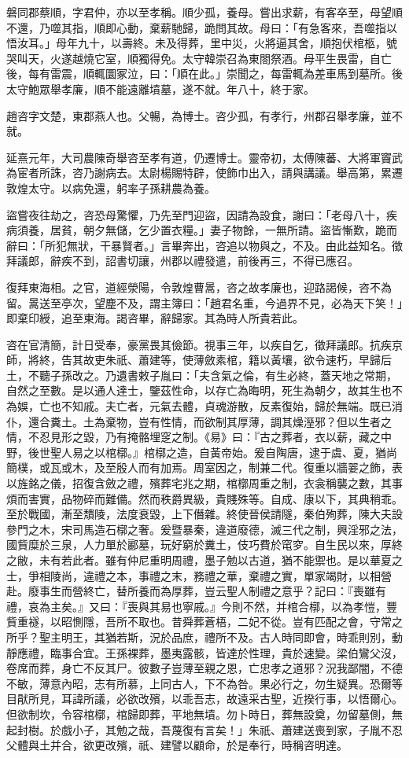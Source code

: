 \begin{pinyinscope}
磐同郡蔡順，字君仲，亦以至孝稱。順少孤，養母。嘗出求薪，有客卒至，母望順不還，乃噬其指，順即心動，棄薪馳歸，跪問其故。母曰：「有急客來，吾噬指以悟汝耳。」母年九十，以壽終。未及得葬，里中災，火將逼其舍，順抱伏棺柩，號哭叫天，火遂越燒它室，順獨得免。太守韓崇召為東閤祭酒。母平生畏雷，自亡後，每有雷震，順輒圜冢泣，曰：「順在此。」崇聞之，每雷輒為差車馬到墓所。後太守鮑眾舉孝廉，順不能遠離墳墓，遂不就。年八十，終于家。

趙咨字文楚，東郡燕人也。父暢，為博士。咨少孤，有孝行，州郡召舉孝廉，並不就。

延熹元年，大司農陳奇舉咨至孝有道，仍遷博士。靈帝初，太傅陳蕃、大將軍竇武為宦者所誅，咨乃謝病去。太尉楊賜特辟，使飾巾出入，請與講議。舉高第，累遷敦煌太守。以病免還，躬率子孫耕農為養。

盜嘗夜往劫之，咨恐母驚懼，乃先至門迎盜，因請為設食，謝曰：「老母八十，疾病須養，居貧，朝夕無儲，乞少置衣糧。」妻子物餘，一無所請。盜皆慚歎，跪而辭曰：「所犯無狀，干暴賢者。」言畢奔出，咨追以物與之，不及。由此益知名。徵拜議郎，辭疾不到，詔書切讓，州郡以禮發遣，前後再三，不得已應召。

復拜東海相。之官，道經滎陽，令敦煌曹暠，咨之故孝廉也，迎路謁候，咨不為留。暠送至亭次，望塵不及，謂主簿曰：「趙君名重，今過界不見，必為天下笑！」即棄印綬，追至東海。謁咨畢，辭歸家。其為時人所貴若此。

咨在官清簡，計日受奉，豪黨畏其儉節。視事三年，以疾自乞，徵拜議郎。抗疾京師，將終，告其故吏朱祇、蕭建等，使薄斂素棺，籍以黃壤，欲令速朽，早歸后土，不聽子孫改之。乃遺書敕子胤曰：「夫含氣之倫，有生必終，蓋天地之常期，自然之至數。是以通人達士，鑒茲性命，以存亡為晦明，死生為朝夕，故其生也不為娛，亡也不知戚。夫亡者，元氣去體，貞魂游散，反素復始，歸於無端。既已消仆，還合糞土。土為棄物，豈有性情，而欲制其厚薄，調其燥溼邪？但以生者之情，不忍見形之毀，乃有掩骼埋窆之制。《易》曰：『古之葬者，衣以薪，藏之中野，後世聖人易之以棺槨。』棺槨之造，自黃帝始。爰自陶唐，逮于虞、夏，猶尚簡樸，或瓦或木，及至殷人而有加焉。周室因之，制兼二代。復重以牆翣之飾，表以旌銘之儀，招復含斂之禮，殯葬宅兆之期，棺槨周重之制，衣衾稱襲之數，其事煩而害實，品物碎而難備。然而秩爵異級，貴賤殊等。自成、康以下，其典稍乖。至於戰國，漸至穨陵，法度衰毀，上下僭雜。終使晉侯請隧，秦伯殉葬，陳大夫設參門之木，宋司馬造石槨之奢。爰暨暴秦，違道廢德，滅三代之制，興淫邪之法，國貲糜於三泉，人力單於酈墓，玩好窮於糞土，伎巧費於窀穸。自生民以來，厚終之敝，未有若此者。雖有仲尼重明周禮，墨子勉以古道，猶不能禦也。是以華夏之士，爭相陵尚，違禮之本，事禮之末，務禮之華，棄禮之實，單家竭財，以相營赴。廢事生而營終亡，替所養而為厚葬，豈云聖人制禮之意乎？記曰：『喪雖有禮，哀為主矣。』又曰：『喪與其易也寧戚。』今則不然，并棺合槨，以為孝愷，豐貲重襚，以昭惻隱，吾所不取也。昔舜葬蒼梧，二妃不從。豈有匹配之會，守常之所乎？聖主明王，其猶若斯，況於品庶，禮所不及。古人時同即會，時乖則別，動靜應禮，臨事合宜。王孫裸葬，墨夷露骸，皆達於性理，貴於速變。梁伯鸞父沒，卷席而葬，身亡不反其尸。彼數子豈薄至親之恩，亡忠孝之道邪？況我鄙闇，不德不敏，薄意內昭，志有所慕，上同古人，下不為咎。果必行之，勿生疑異。恐爾等目猒所見，耳諱所議，必欲改殯，以乖吾志，故遠采古聖，近揆行事，以悟爾心。但欲制坎，令容棺槨，棺歸即葬，平地無墳。勿卜時日，葬無設奠，勿留墓側，無起封樹。於戲小子，其勉之哉，吾蔑復有言矣！」朱祇、蕭建送喪到家，子胤不忍父體與土并合，欲更改殯，祇、建譬以顧命，於是奉行，時稱咨明達。


\end{pinyinscope}

